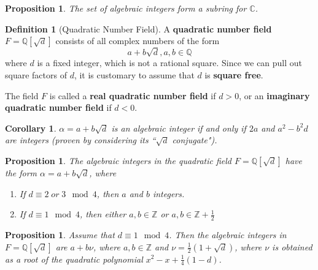 \documentclass[12pt]{article}
\newtheorem{cor}[thm]{Corollary}
\newtheorem{prop}[thm]{Proposition}
\theoremstyle{definition}
\newtheorem{defn}[thm]{Definition}
\theoremstyle{remark}
\numberwithin{equation}{section}
\newcommand\C{\mathbb C}    %
\newcommand\Z{\mathbb Z}    %
\newcommand\Q{\mathbb Q}    %
\newcommand\B[1]{\textbf{ #1}}
\begin{document}
\vspace{15pt}

\begin{prop}
        The set of algebraic integers form a subring for $\C$.
\end{prop}

\vspace{15pt}

\begin{defn}[Quadratic Number Field]
        A \B{quadratic number field} $F = \Q[\sqrt{d}]$ consists of all complex numbers of the form \begin{equation}
                a+b\sqrt{d},a,b \in \Q
        \end{equation}
        where $d$ is a fixed integer, which is not a rational square. Since we can pull out square factors of $d$, it is customary to assume that $d$ is \B{square free}.


        The field $F$ is called a \B{real quadratic number field} if $d >0$, or an \B{imaginary quadratic number field} if $d < 0$.
\end{defn}


\vspace{15pt}

\begin{cor}
        $\alpha = a+b\sqrt{d}$ is an algebraic integer if and only if $2a$ and $a^2-b^2d$ are integers (proven by considering its ``$\sqrt{d}$ conjugate").
\end{cor}


\vspace{15pt}


\begin{prop}
        The algebraic integers in the quadratic field $F = \Q[\sqrt{d}]$ have the form $\alpha = a+b\sqrt{d}$, where \begin{enumerate}
                \item If $d \equiv 2\;or\;3\mod 4$, then $a$ and $b$ integers.
                \item If $d \equiv 1 \mod 4$, then either $a,b \in \Z$ or $a,b \in \Z + \frac{1}{2}$
        \end{enumerate}
\end{prop}


\vspace{15pt}

\begin{prop}
        Assume that $d \equiv 1 \mod 4$. Then the algebraic integers in $F = \Q[\sqrt{d}]$ are $a + b\nu$, where $a,b \in \Z$ and $\nu = \frac{1}{2}(1+\sqrt{d})$, where $\nu$ is obtained as a root of the quadratic polynomial $x^2 - x + \frac{1}{4}(1-d)$.
\end{prop}
\end{document}
